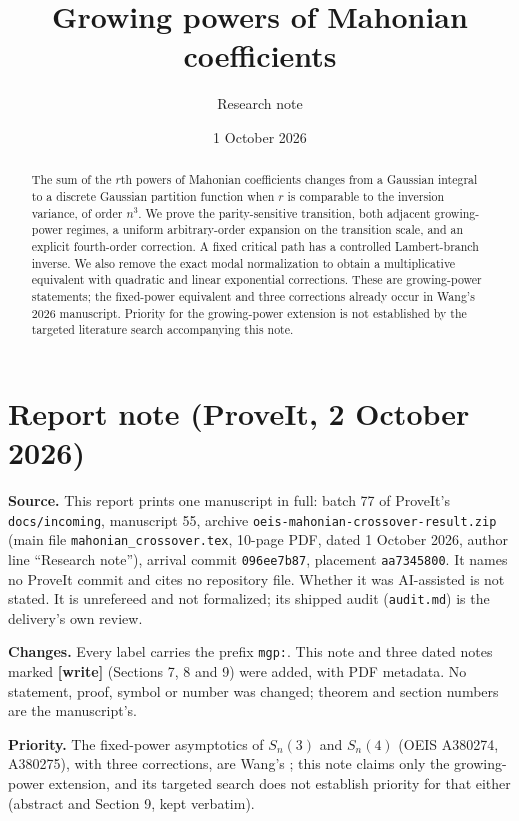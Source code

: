 \documentclass[11pt]{article}
\title{Growing powers of Mahonian coefficients}
\author{Research note}\date{1 October 2026}
\begin{document}
\maketitle
\begin{abstract}
The sum of the $r$th powers of Mahonian coefficients changes from a Gaussian integral to a discrete Gaussian partition function when $r$ is comparable to the inversion variance, of order $n^3$. We prove the parity-sensitive transition, both adjacent growing-power regimes, a uniform arbitrary-order expansion on the transition scale, and an explicit fourth-order correction. A fixed critical path has a controlled Lambert-branch inverse. We also remove the exact modal normalization to obtain a multiplicative equivalent with quadratic and linear exponential corrections. These are growing-power statements; the fixed-power equivalent and three corrections already occur in Wang's 2026 manuscript. Priority for the growing-power extension is not established by the targeted literature search accompanying this note.
\end{abstract}

\section*{Report note (ProveIt, 2 October 2026)}\label{mgp:sec:note}
\begingroup\small\sloppy
\noindent\textbf{Source.} This report prints one manuscript in full: batch 77 of ProveIt's
\texttt{docs/incoming}, manuscript 55, archive \texttt{oeis-mahonian-crossover-result.zip} (main file
\texttt{mahonian\_crossover.tex}, 10-page PDF, dated 1 October 2026, author line ``Research note''),
arrival commit \texttt{096ee7b87}, placement \texttt{aa7345800}. It names no ProveIt commit and
cites no repository file. Whether it was AI-assisted is not stated. It is unrefereed and not
formalized; its shipped audit (\texttt{audit.md}) is the delivery's own review.

\smallskip\noindent\textbf{Changes.} Every label carries the prefix \texttt{mgp:}. This note and three
dated notes marked \textbf{[write]} (Sections 7, 8 and 9) were added, with PDF metadata. No
statement, proof, symbol or number was changed; theorem and section numbers are the manuscript's.

\smallskip\noindent\textbf{Priority.} The fixed-power asymptotics of $S_n(3)$ and $S_n(4)$ (OEIS
A380274, A380275), with three corrections, are Wang's \cite{wang}; this note claims only the
growing-power extension, and its targeted search does not establish priority for that either
(abstract and Section 9, kept verbatim).
\end{document}
